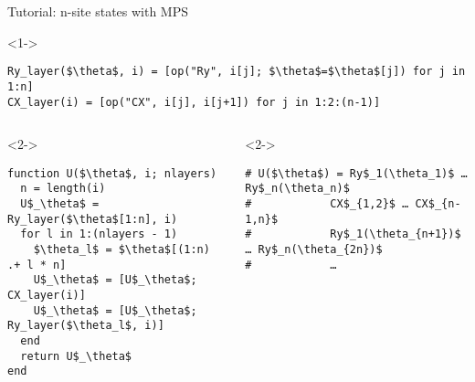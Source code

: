 \begin{frame}[fragile]{Tutorial: n-site states with MPS}


\begin{onlyenv}<1->

\begin{lstlisting}[language=JuliaLocal, style=julia, mathescape, basicstyle=\small]
Ry_layer($\theta$, i) = [op("Ry", i[j]; $\theta$=$\theta$[j]) for j in 1:n]
CX_layer(i) = [op("CX", i[j], i[j+1]) for j in 1:2:(n-1)]
\end{lstlisting}

\end{onlyenv}

\begin{columns}

\begin{column}{5cm}

\begin{onlyenv}<2->

\begin{lstlisting}[language=JuliaLocal, style=julia, mathescape, basicstyle=\small]
function U($\theta$, i; nlayers)
  n = length(i)
  U$_\theta$ = Ry_layer($\theta$[1:n], i)
  for l in 1:(nlayers - 1)
    $\theta_l$ = $\theta$[(1:n) .+ l * n]
    U$_\theta$ = [U$_\theta$; CX_layer(i)]
    U$_\theta$ = [U$_\theta$; Ry_layer($\theta_l$, i)]
  end
  return U$_\theta$
end
\end{lstlisting}

\end{onlyenv}

\end{column}

\begin{column}{5.5cm}

\begin{onlyenv}<2->

\begin{lstlisting}[style=julia, numbers=none, mathescape, basicstyle=\small]
# U($\theta$) = Ry$_1(\theta_1)$ … Ry$_n(\theta_n)$
#            CX$_{1,2}$ … CX$_{n-1,n}$
#            Ry$_1(\theta_{n+1})$ … Ry$_n(\theta_{2n})$
#            …





 \end{lstlisting}

\end{onlyenv}

\end{column}

\end{columns}

\end{frame}
